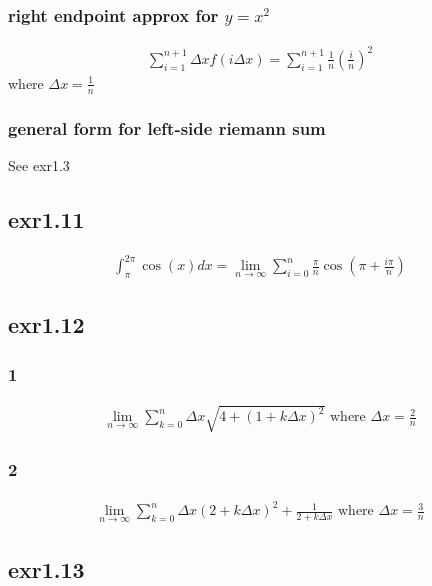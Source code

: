 \documentclass[letterpaper]{article}
\begin{document}
\subsubsection{right endpoint approx for \(y=x^2\)}
\label{sec:orgfa2093d}

\[\begin{aligned}
    \sum_{i=1}^{n+1} \Delta x f(i \Delta x) = \sum_{i=1}^{n+1} \frac{1}{n} \left( \frac{i}{n}\right) ^2
	\end{aligned}\]
where \(\Delta x = \frac{1}{n}\)

\subsubsection{general form for left-side riemann sum}
\label{sec:orgc2ab568}
See exr1.3

\subsection{exr1.11}
\label{sec:orgfddff9c}

\[\begin{aligned}
   \int_\pi^{2\pi} \cos(x)dx = \lim_{n\to \infty} \sum_{i=0}^n \frac{\pi}{n}\cos\left( \pi + \frac{i\pi}{n}\right)
   \end{aligned}\]

\subsection{exr1.12}
\label{sec:org11e4434}

\subsubsection{1}
\label{sec:orgb461617}
\[\begin{aligned}
    \lim_{n \to \infty} \sum_{k=0}^n \Delta x \sqrt{4+(1+k\Delta x)^2} \text{ where }\Delta x = \frac{2}{n}
	\end{aligned}\]

\subsubsection{2}
\label{sec:orgaf265b1}
\[\begin{aligned}
    \lim_{n \to  \infty} \sum_{k=0}^n \Delta x(2+k\Delta x)^2 + \frac{1}{2+k\Delta x} \text{ where } \Delta x = \frac{3}{n}
	\end{aligned}\]

\subsection{exr1.13}
\label{sec:orge050e33}
\end{document}
